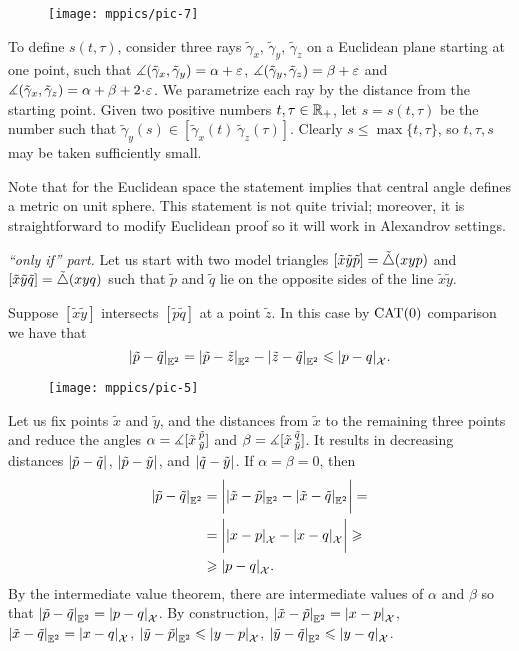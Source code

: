 \begin{wrapfigure}{o}{30 mm}
\vskip-8mm
\centering
\texttt{[image: mppics/pic-7]}
\end{wrapfigure}

To define $s(t,\tau)$, consider three rays $\tilde \gamma_x$, $\tilde \gamma_y$, $\tilde \gamma_z$ on a Euclidean plane starting at one point, such that $\measuredangle(\tilde \gamma_x,\tilde \gamma_y)=\alpha+\varepsilon$,
$\measuredangle(\tilde \gamma_y,\tilde \gamma_z)=\beta+\varepsilon$ and $\mangle(\tilde \gamma_x,\tilde \gamma_z)=\alpha+\beta+2\cdot \eps$.
We parametrize each ray by the distance from the starting point.
Given two positive numbers $t,\tau\in\mathbb{R}_+$, let $s=s(t,\tau)$ be 
the number such that 
$\tilde \gamma_y(s)\in[\tilde \gamma_x(t)\ \tilde \gamma_z(\tau)]$. 
Clearly $s\le\max\{t,\tau\}$, so $t,\tau,s$ may be taken sufficiently small.

Note that for the Euclidean space the statement implies that central angle defines a metric on unit sphere.
This statement is not quite trivial; moreover, it is straightforward to modify Euclidean proof so it will work in Alexandrov settings. 

 \textit{``only if'' part.}
Let us start with two model triangles $[\tilde x\tilde y\tilde p]=\tilde\triangle(xyp)$ and $[\tilde x\tilde y\tilde q]=\tilde\triangle(xyq)$ such that $\tilde p$ and $\tilde q$ lie on the opposite sides of the line $\tilde x\tilde y$.

Suppose $[\tilde x \tilde y]$ intersects $[\tilde p\tilde q]$ at a point $\tilde z$.
In this case by $\mathrm{CAT}(0)$ comparison we have that
\[\dist{\tilde p}{\tilde q}{\EE^2}=\dist{\tilde p}{\tilde z}{\EE^2}-\dist{\tilde z}{\tilde q}{\EE^2}\le \dist{p}{q}{\spc{X}}.\]

\begin{wrapfigure}[8]{o}{30 mm}
\vskip-2mm
\centering
\texttt{[image: mppics/pic-5]}
\end{wrapfigure}

Let us fix points $\tilde x$ and $\tilde y$, and the distances from $\tilde x$ to the remaining three points and reduce the angles $\alpha=\measuredangle[\tilde x\,{}^{\tilde p}_{\tilde y}]$ and $\beta=\measuredangle[\tilde x\,{}^{\tilde q}_{\tilde y}]$.
It results in decreasing distances $\dist{\tilde p}{\tilde q}{}$, $\dist{\tilde p}{\tilde y}{}$, and $\dist{\tilde q}{\tilde y}{}$.
If $\alpha=\beta=0$, then 
\begin{align*}
\dist{\tilde p}{\tilde q}{\EE^2}&=
\biggl|\dist{\tilde x}{\tilde p}{\EE^2}-\dist{\tilde x}{\tilde q}{\EE^2}\biggr|=
\\
&=\biggl|\dist{ x}{ p}{\spc{X}}-\dist{ x}{ q}{\spc{X}}\biggr|\ge
\\
&\ge\dist{p}{q}{\spc{X}}.
\end{align*}
By the intermediate value theorem, there are intermediate values of $\alpha$ and $\beta$ so that $\dist{\tilde p}{\tilde q}{\EE^2}\z=\dist{p}{q}{\spc{X}}$.
By construction, $\dist{\tilde x}{\tilde p}{\EE^2}=\dist{x}{p}{\spc{X}}$, $\dist{\tilde x}{\tilde q}{\EE^2}=\dist{x}{q}{\spc{X}}$, $\dist{\tilde y}{\tilde p}{\EE^2}\le\dist{y}{p}{\spc{X}}$, $\dist{\tilde y}{\tilde q}{\EE^2}\le\dist{y}{q}{\spc{X}}$.

